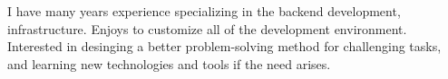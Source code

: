 

\begin{cvparagraph}

I have many years experience specializing in the backend development, infrastructure. Enjoys to customize all of the development environment. Interested in desinging a better problem-solving method for challenging tasks, and learning new technologies and tools if the need arises.
\end{cvparagraph}
